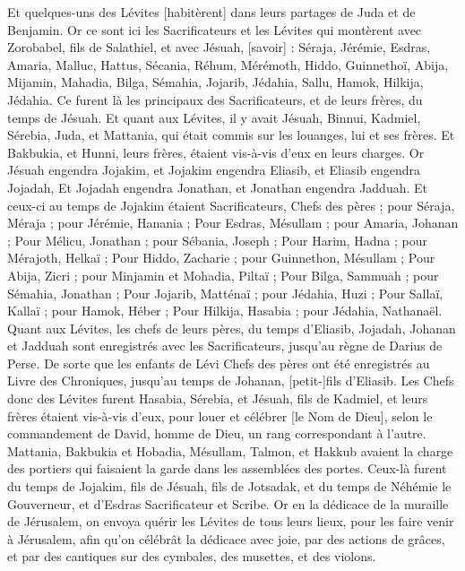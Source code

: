 \begin{multicols}{2}
{Et quelques-uns des Lévites [habitèrent] dans leurs partages de Juda et de Benjamin.
\VerseOne{}Or ce sont ici les Sacrificateurs et les Lévites qui montèrent avec Zorobabel, fils de Salathiel, et avec Jésuah, [savoir] : Séraja, Jérémie, Esdras,
Amaria, Malluc, Hattus,
Sécania, Réhum, Mérémoth,
Hiddo, Guinnethoï, Abija,
Mijamin, Mahadia, Bilga,
Sémahia, Jojarib, Jédahia,
Sallu, Hamok, Hilkija, Jédahia. Ce furent là les principaux des Sacrificateurs, et de leurs frères, du temps de Jésuah.
Et quant aux Lévites, il y avait Jésuah, Binnui, Kadmiel, Sérebia, Juda, et Mattania, qui était commis sur les louanges, lui et ses frères.
Et Bakbukia, et Hunni, leurs frères, étaient vis-à-vis d'eux en leurs charges.
Or Jésuah engendra Jojakim, et Jojakim engendra Eliasib, et Eliasib engendra Jojadah,
Et Jojadah engendra Jonathan, et Jonathan engendra Jadduah.
Et ceux-ci au temps de Jojakim étaient Sacrificateurs, Chefs des pères ; pour Séraja, Méraja ; pour Jérémie, Hanania ;
Pour Esdras, Mésullam ; pour Amaria, Johanan ;
Pour Mélicu, Jonathan ; pour Sébania, Joseph ;
Pour Harim, Hadna ; pour Mérajoth, Helkaï ;
Pour Hiddo, Zacharie ; pour Guinnethon, Mésullam ;
Pour Abija, Zicri ; pour Minjamin et Mohadia, Piltaï ;
Pour Bilga, Sammuah ; pour Sémahia, Jonathan ;
Pour Jojarib, Matténaï ; pour Jédahia, Huzi ;
Pour Sallaï, Kallaï ; pour Hamok, Héber ;
Pour Hilkija, Hasabia ; pour Jédahia, Nathanaël.
Quant aux Lévites, les chefs de leurs pères, du temps d'Eliasib, Jojadah, Johanan et Jadduah sont enregistrés avec les Sacrificateurs, jusqu'au règne de Darius de Perse.
De sorte que les enfants de Lévi Chefs des pères ont été enregistrés au Livre des Chroniques, jusqu'au temps de Johanan, [petit-]fils d'Eliasib.
Les Chefs donc des Lévites furent Hasabia, Sérebia, et Jésuah, fils de Kadmiel, et leurs frères étaient vis-à-vis d'eux, pour louer et célébrer [le Nom de Dieu], selon le commandement de David, homme de Dieu, un rang correspondant à l'autre.
Mattania, Bakbukia et Hobadia, Mésullam, Talmon, et Hakkub avaient la charge des portiers qui faisaient la garde dans les assemblées des portes.
Ceux-là furent du temps de Jojakim, fils de Jésuah, fils de Jotsadak, et du temps de Néhémie le Gouverneur, et d'Esdras Sacrificateur et Scribe.
Or en la dédicace de la muraille de Jérusalem, on envoya quérir les Lévites de tous leurs lieux, pour les faire venir à Jérusalem, afin qu'on célébrât la dédicace avec joie, par des actions de grâces, et par des cantiques sur des cymbales, des musettes, et des violons.
}
\end{multicols}
